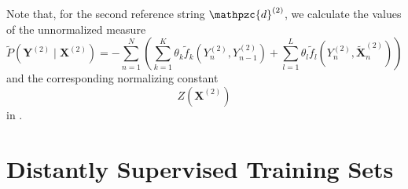 Note that, for the second reference string $\mathpzc{d}^{(2)}$, we calculate the values of the unnormalized measure
\begin{equation*}
  \tilde{P}(\mathbf{Y}^{(2)}\mid\mathbf{X}^{(2)})=-\sum_{n=1}^N \left(\sum_{k=1}^K\theta_k \tilde{f}_k\left(Y_n^{(2)},Y_{n-1}^{(2)}\right)+\sum_{l=1}^L\theta_l \tilde{f}_l\left(Y_n^{(2)},\mathbf{\tilde{X}}_n^{(2)}\right)\right)
\end{equation*}
and the corresponding normalizing constant
\begin{equation*}
Z\left(\mathbf{X}^{(2)}\right)
\end{equation*}
in .




\section{Distantly Supervised Training Sets}\label{app:sec-generalized-expectation}

